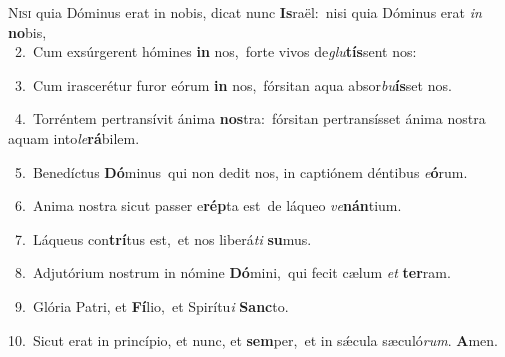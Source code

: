 \lettrine{\initial\textcolor{\initialcolor}{N}}{isi} quia Dóminus erat in nobis, dicat nunc \textbf{Is}\-raël:~\star nisi quia Dóminus erat \textit{in} \textbf{no}\-bis,\\
{\numbfont\textcolor{\numbcolor}{~2.}}~Cum exsúrgerent hómines \textbf{in} nos,~\star forte vivos de\-\textit{glu}\-\textbf{tís}sent nos:\par
{\numbfont\textcolor{\numbcolor}{~3.}}~Cum irascerétur furor eórum \textbf{in} nos,~\star fórsitan aqua absor\-\textit{bu}\-\textbf{ís}set nos.\par
{\numbfont\textcolor{\numbcolor}{~4.}}~Torréntem pertransívit ánima \textbf{nos}\-tra:~\star fórsitan pertransísset ánima nostra aquam into\-\textit{le}\-\textbf{rá}bilem.\par
{\numbfont\textcolor{\numbcolor}{~5.}}~Benedíctus \textbf{Dó}\-minus~\star qui non dedit nos, in captiónem déntibus \textit{e}\-\textbf{ó}rum.\par
{\numbfont\textcolor{\numbcolor}{~6.}}~Anima nostra sicut passer e\-\textbf{rép}\-ta est~\star de láqueo \textit{ve}\-\textbf{nán}tium.\par
{\numbfont\textcolor{\numbcolor}{~7.}}~Láqueus con\-\textbf{trí}\-tus est,~\star et nos liberá\textit{ti} \textbf{su}\-mus.\par
{\numbfont\textcolor{\numbcolor}{~8.}}~Adjutórium nostrum in nómine \textbf{Dó}\-mini,~\star qui fecit cælum \textit{et} \textbf{ter}\-ram.\par
{\numbfont\textcolor{\numbcolor}{~9.}}~Glória Patri, et \textbf{Fí}\-lio,~\star et Spirítu\textit{i} \textbf{Sanc}\-to.\par
{\numbfont\textcolor{\numbcolor}{10.}}~Sicut erat in princípio, et nunc, et \textbf{sem}\-per,~\star et in sǽcula sæculó\-\textit{rum}\-. \textbf{A}\-men.\par
